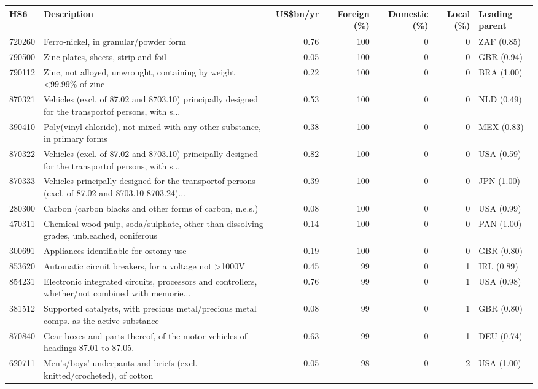 \begin{tabular}{@{}l p{6.4cm} r r r r l@{}}
\toprule
HS6 & Description & US\$bn/yr & Foreign (\%) & Domestic (\%) & Local (\%) & Leading parent \\
\midrule
720260 & Ferro-nickel, in granular/\allowbreak{}powder form & 0.76 & 100 & 0 & 0 & ZAF (0.85) \\
790500 & Zinc plates, sheets, strip and foil & 0.05 & 100 & 0 & 0 & GBR (0.94) \\
790112 & Zinc, not alloyed, unwrought, containing by weight <99.99\% of zinc & 0.22 & 100 & 0 & 0 & BRA (1.00) \\
870321 & Vehicles (excl. of 87.02 and 8703.10) principally designed for the transportof persons, with s... & 0.53 & 100 & 0 & 0 & NLD (0.49) \\
390410 & Poly(vinyl chloride), not mixed with any other substance, in primary forms & 0.38 & 100 & 0 & 0 & MEX (0.83) \\
870322 & Vehicles (excl. of 87.02 and 8703.10) principally designed for the transportof persons, with s... & 0.82 & 100 & 0 & 0 & USA (0.59) \\
870333 & Vehicles principally designed for the transportof persons (excl. of 87.02 and 8703.10-8703.24)... & 0.39 & 100 & 0 & 0 & JPN (1.00) \\
280300 & Carbon (carbon blacks and other forms of carbon, n.e.s.) & 0.08 & 100 & 0 & 0 & USA (0.99) \\
470311 & Chemical wood pulp, soda/\allowbreak{}sulphate, other than dissolving grades, unbleached, coniferous & 0.14 & 100 & 0 & 0 & PAN (1.00) \\
300691 & Appliances identifiable for ostomy use & 0.19 & 100 & 0 & 0 & GBR (0.80) \\
853620 & Automatic circuit breakers, for a voltage not >1000V & 0.45 & 99 & 0 & 1 & IRL (0.89) \\
854231 & Electronic integrated  circuits, processors and controllers, whether/\allowbreak{}not combined with memorie... & 0.76 & 99 & 0 & 1 & USA (0.98) \\
381512 & Supported catalysts, with precious metal/\allowbreak{}precious metal comps. as the active substance & 0.08 & 99 & 0 & 1 & GBR (0.80) \\
870840 & Gear boxes and parts thereof, of the motor vehicles of headings 87.01 to 87.05. & 0.63 & 99 & 0 & 1 & DEU (0.74) \\
620711 & Men's/\allowbreak{}boys' underpants and briefs (excl. knitted/\allowbreak{}crocheted), of cotton & 0.05 & 98 & 0 & 2 & USA (1.00) \\

\end{tabular}
